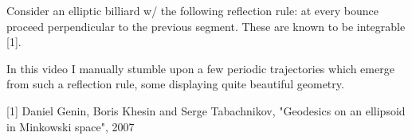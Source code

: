 Consider an elliptic billiard w/ the following reflection rule: at every bounce proceed perpendicular to the previous segment. These are known to be integrable [1].

In this video I manually stumble upon a few periodic trajectories which emerge from such a reflection rule, some displaying quite beautiful geometry.

[1] Daniel Genin, Boris Khesin and Serge Tabachnikov, "Geodesics on an ellipsoid in Minkowski space", 2007